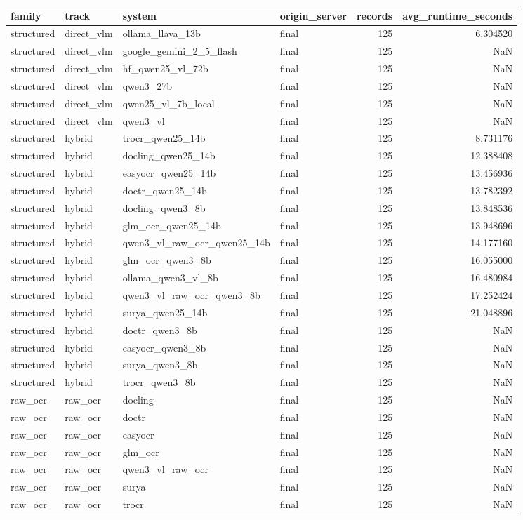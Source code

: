 \begin{tabular}{llllrr}
\toprule
family & track & system & origin\_server & records & avg\_runtime\_seconds \\
\midrule
structured & direct\_vlm & ollama\_llava\_13b & final & 125 & 6.304520 \\
structured & direct\_vlm & google\_gemini\_2\_5\_flash & final & 125 & NaN \\
structured & direct\_vlm & hf\_qwen25\_vl\_72b & final & 125 & NaN \\
structured & direct\_vlm & qwen3\_27b & final & 125 & NaN \\
structured & direct\_vlm & qwen25\_vl\_7b\_local & final & 125 & NaN \\
structured & direct\_vlm & qwen3\_vl & final & 125 & NaN \\
structured & hybrid & trocr\_qwen25\_14b & final & 125 & 8.731176 \\
structured & hybrid & docling\_qwen25\_14b & final & 125 & 12.388408 \\
structured & hybrid & easyocr\_qwen25\_14b & final & 125 & 13.456936 \\
structured & hybrid & doctr\_qwen25\_14b & final & 125 & 13.782392 \\
structured & hybrid & docling\_qwen3\_8b & final & 125 & 13.848536 \\
structured & hybrid & glm\_ocr\_qwen25\_14b & final & 125 & 13.948696 \\
structured & hybrid & qwen3\_vl\_raw\_ocr\_qwen25\_14b & final & 125 & 14.177160 \\
structured & hybrid & glm\_ocr\_qwen3\_8b & final & 125 & 16.055000 \\
structured & hybrid & ollama\_qwen3\_vl\_8b & final & 125 & 16.480984 \\
structured & hybrid & qwen3\_vl\_raw\_ocr\_qwen3\_8b & final & 125 & 17.252424 \\
structured & hybrid & surya\_qwen25\_14b & final & 125 & 21.048896 \\
structured & hybrid & doctr\_qwen3\_8b & final & 125 & NaN \\
structured & hybrid & easyocr\_qwen3\_8b & final & 125 & NaN \\
structured & hybrid & surya\_qwen3\_8b & final & 125 & NaN \\
structured & hybrid & trocr\_qwen3\_8b & final & 125 & NaN \\
raw\_ocr & raw\_ocr & docling & final & 125 & NaN \\
raw\_ocr & raw\_ocr & doctr & final & 125 & NaN \\
raw\_ocr & raw\_ocr & easyocr & final & 125 & NaN \\
raw\_ocr & raw\_ocr & glm\_ocr & final & 125 & NaN \\
raw\_ocr & raw\_ocr & qwen3\_vl\_raw\_ocr & final & 125 & NaN \\
raw\_ocr & raw\_ocr & surya & final & 125 & NaN \\
raw\_ocr & raw\_ocr & trocr & final & 125 & NaN \\
\bottomrule
\end{tabular}
